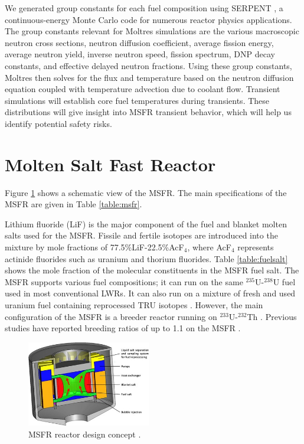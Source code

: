 \documentclass{anstrans}
\begin{document}
    We generated group constants for 
    each fuel composition using SERPENT \cite{leppanen_serpent_2015}, a 
    continuous-energy Monte Carlo code for numerous reactor physics 
    applications. The group constants relevant for Moltres simulations are
    the various macroscopic neutron cross sections, neutron diffusion
    coefficient, average fission energy, average neutron yield, inverse
    neutron speed, fission spectrum, \gls{DNP} decay constants, and effective
    delayed neutron fractions.
    Using these group constants, Moltres then 
    solves for the flux and temperature based on the neutron diffusion 
    equation coupled with temperature advection due to coolant flow. Transient 
    simulations will establish core fuel temperatures during transients.
    These distributions will give insight into MSFR transient behavior,
    which will help us identify potential safety risks.

\section{Molten Salt Fast Reactor}

	Figure \ref{fig:msfr} shows a schematic view of the \gls{MSFR}. The main
	specifications of the \gls{MSFR} are given in Table \ref{table:msfr}.

	Lithium fluoride (LiF) is the major component of the fuel and blanket
	molten salts used for the \gls{MSFR}. Fissile and fertile isotopes are
	introduced
	into the mixture by mole fractions of 77.5\%LiF-22.5\%AcF$_4$, where
	AcF$_4$ represents actinide fluorides such as uranium and thorium
	fluorides. Table \ref{table:fuelsalt} shows the mole fraction of the
	molecular constituents in the \gls{MSFR} fuel salt.
	The \gls{MSFR} supports various fuel compositions; it can run on the same 
	$^{235}$U-$^{238}$U fuel used in most conventional LWRs. It can also run
	on a
	mixture of fresh and used uranium fuel containing reprocessed TRU
	isotopes \cite{fiorina_investigation_2013}. However, the main configuration
	of the \gls{MSFR} is a breeder reactor running on $^{233}$U-$^{232}$Th
	\cite{merle-lucotte_launching_2011}. Previous studies have reported
	breeding ratios of up to 1.1 on the \gls{MSFR} \cite{fiorina_molten_2013}. 

\begin{figure}[t] 
	\centering
	\includegraphics[width=0.48\textwidth]{./figures/MSFR}
	\caption{MSFR reactor design concept \cite{serp_molten_2014}.}
	\label{fig:msfr}
\end{figure} 
\end{document}
